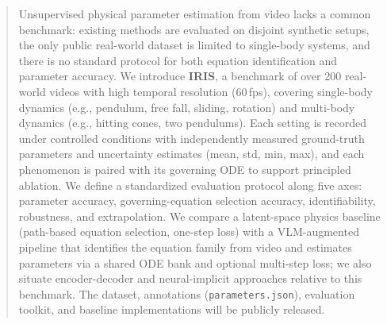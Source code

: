 %

\begin{abstract}
Unsupervised physical parameter estimation from video lacks a common benchmark: existing methods are evaluated on disjoint synthetic setups, the only public real-world dataset is limited to single-body systems, and there is no standard protocol for both equation identification and parameter accuracy. We introduce \textbf{IRIS}, a benchmark of over 200 real-world videos with high temporal resolution (60\,fps), covering single-body dynamics (e.g., pendulum, free fall, sliding, rotation) and multi-body dynamics (e.g., hitting cones, two pendulums). Each setting is recorded under controlled conditions with independently measured ground-truth parameters and uncertainty estimates (mean, std, min, max), and each phenomenon is paired with its governing ODE to support principled ablation. We define a standardized evaluation protocol along five axes: parameter accuracy, governing-equation selection accuracy, identifiability, robustness, and extrapolation. We compare a latent-space physics baseline (path-based equation selection, one-step loss) with a VLM-augmented pipeline that identifies the equation family from video and estimates parameters via a shared ODE bank and optional multi-step loss; we also situate encoder-decoder and neural-implicit approaches relative to this benchmark. The dataset, annotations (\texttt{parameters.json}), evaluation toolkit, and baseline implementations will be publicly released.
\end{abstract}
